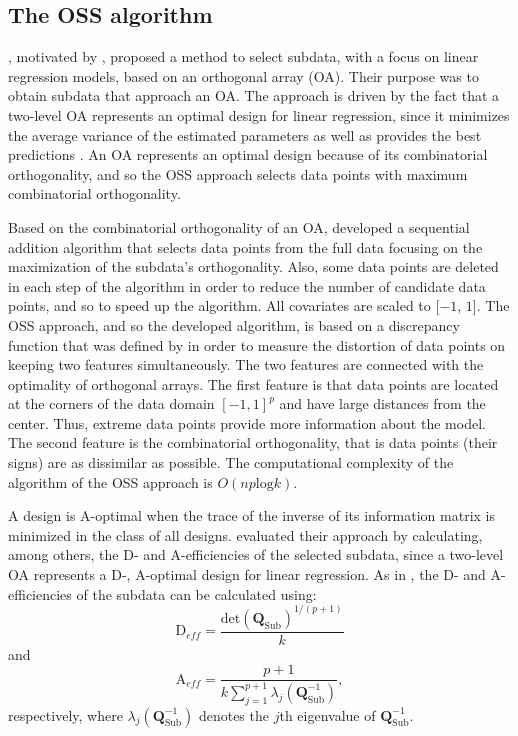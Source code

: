 \documentclass[12pt]{article}
\theoremstyle{definition}
\begin{document}
	\subsection{The OSS algorithm}
	\cite{wang2021oss}, motivated by \cite{wang2019information}, proposed a method to select subdata, with a focus on linear regression models, based on an orthogonal array (OA). Their purpose was to obtain subdata that approach an OA. The approach is driven by the fact that a two-level OA represents an optimal design for linear regression, since it minimizes the average variance of the estimated parameters as well as provides the best predictions \citep{dey&mukerjee}. An OA represents an optimal design because of its combinatorial orthogonality, and so the OSS approach selects data points with maximum combinatorial orthogonality. 
	
	Based on the combinatorial orthogonality of an OA, \cite{wang2021oss} developed a sequential addition algorithm that selects data points from the full data focusing on the maximization of the subdata's orthogonality. Also, some data points are deleted in each step of the algorithm in order to reduce the number of candidate data points, and so to speed up the algorithm. All covariates are scaled to [$-1$, $1$]. 
	The OSS approach, and so the developed algorithm, is based on a discrepancy function that was defined by \cite{wang2021oss} in order to measure the distortion of data points on keeping two features simultaneously. The two features are connected with the optimality of orthogonal arrays. The first feature is that data points are located at the corners of the data domain $[-1, 1]^p$ and have large distances from the center. Thus, extreme data points provide more information about the model. The second feature is the combinatorial orthogonality, that is data points (their signs) are as dissimilar as possible. The computational complexity of the algorithm of the OSS approach is $O(np\text{log}k)$.
	
	A design is A-optimal when the trace of the inverse of its information matrix is minimized in the class of all designs. \cite{wang2021oss} evaluated their approach by calculating, among others, the D- and A-efficiencies of the selected subdata, since a two-level OA represents a D-, A-optimal design for linear regression. {\color{red} As in \cite{wang2021oss},} the D- and A-efficiencies of the subdata can be calculated using:
	$$
	\text{D}_{eff}=\dfrac{\text{det}(\textbf{Q}_{\text{Sub}})^{1/(p+1)}}{k}
	$$
	and
	$$
	\text{A}_{eff}=\dfrac{p+1}{k\sum_{j=1}^{p+1}\lambda_j(\textbf{Q}_{\text{Sub}}^{-1})},
	$$
	respectively, where $\lambda_j(\textbf{Q}_{\text{Sub}}^{-1})$ denotes the $j$th eigenvalue of $\textbf{Q}_{\text{Sub}}^{-1}$.
	
\end{document}
